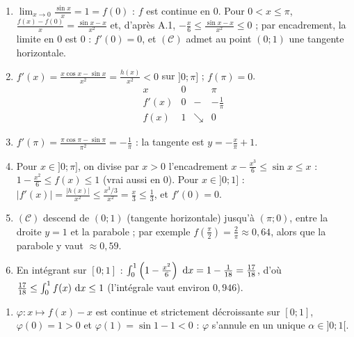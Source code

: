 \begin{corrige}
\begin{sol}
\begin{description}
\begin{enumerate}
      \end{enumerate}
\item[Partie B.] \begin{enumerate}
      \item $\lim_{x\to 0} \frac{\sin x}{x} = 1 = f(0)$ : $f$ est continue en $0$.
            Pour $0 < x \leq \pi$, $\frac{f(x) - f(0)}{x} = \frac{\sin x - x}{x^2}$ et, d'apr\`es A.1,
            $-\frac{x}{6} \leq \frac{\sin x - x}{x^2} \leq 0$ ; par encadrement, la limite en $0$ est $0$ : $f'(0) = 0$,
            et $(\mathscr{C})$ admet au point $(0 ; 1)$ une tangente horizontale.
      \item $f'(x) = \frac{x\cos x - \sin x}{x^2} = \frac{h(x)}{x^2} < 0$ sur $]0 ; \pi]$ ; $f(\pi) = 0$.
            \[
            \begin{array}{c|ccc}
            x & 0 & & \pi \\ \hline
            f'(x) & 0 & - & -\frac{1}{\pi} \\ \hline
            f(x) & 1 & \searrow & 0
            \end{array}
            \]
      \item $f'(\pi) = \frac{\pi \cos\pi - \sin\pi}{\pi^2} = -\frac{1}{\pi}$ : la tangente est $\boxed{y = -\frac{x}{\pi} + 1}$.
      \item Pour $x \in ]0 ; \pi]$, on divise par $x > 0$ l'encadrement $x - \frac{x^3}{6} \leq \sin x \leq x$ :
            $1 - \frac{x^2}{6} \leq f(x) \leq 1$ (vrai aussi en $0$).
            Pour $x \in ]0 ; 1]$ : $|f'(x)| = \frac{|h(x)|}{x^2} \leq \frac{x^3/3}{x^2} = \frac{x}{3} \leq \frac{1}{3}$, et $f'(0) = 0$.
      \item $(\mathscr{C})$ descend de $(0 ; 1)$ (tangente horizontale) jusqu'\`a $(\pi ; 0)$, entre la droite $y = 1$ et la parabole ;
            par exemple $f\left( \frac{\pi}{2} \right) = \frac{2}{\pi} \approx 0{,}64$, alors que la parabole y vaut $\approx 0{,}59$.
      \item En int\'egrant sur $[0 ; 1]$ : $\int_0^1 \left( 1 - \frac{x^2}{6} \right)~\mathrm{d}x = 1 - \frac{1}{18} = \frac{17}{18}$, d'o\`u
            $\frac{17}{18} \leq \int_0^1 f(x)~\mathrm{d}x \leq 1$ (l'int\'egrale vaut environ $0{,}946$).
      \end{enumerate}
\item[Partie C.] \begin{enumerate}
      \item $\varphi : x \mapsto f(x) - x$ est continue et strictement d\'ecroissante sur $[0 ; 1]$, $\varphi(0) = 1 > 0$ et
            $\varphi(1) = \sin 1 - 1 < 0$ : $\varphi$ s'annule en un unique $\alpha \in ]0 ; 1[$.

\end{enumerate}
\end{description}
\end{sol}
\end{corrige}
